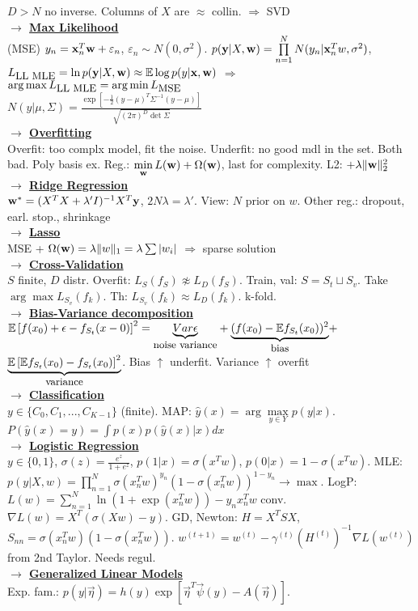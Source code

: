 \documentclass[12pt]{article}
\newcommand{\myvector}[1]{{\bf{#1}}}
\newcommand{\x}{\myvector{x}}
\newcommand{\y}{\myvector{y}}
\newcommand{\w}{\myvector{w}}
\newcommand{\underlabel}[2]{\underset{\mbox{\small #2}}{\underbrace{#1}}}
\newcommand{\mytitle}[1]{ {\bf $\rightarrow$ \underline{#1}}\\}
\begin{document}
\begin{multicols*}{2}
$D>N$ no inverse. Columns of $X$ are $\approx$ collin. $\Rightarrow$ SVD\\
\mytitle{Max Likelihood}
(MSE) $y_n=\x_n^T\w+\varepsilon_n$, $\varepsilon_n\sim N(0, \sigma^2)$. $p(\y|X,\w)=\prod\limits_{n=1}^NN(y_n|\x_n^Tw,\sigma^2)$, $L_{\mbox{\small LL MLE}}=\ln p(\y|X,\w)\approx \mathbb{E}\log p(y|\x,\w)$ $\Rightarrow$ $\arg\max L_{\mbox{\small LL MLE}}=\arg\min L_{\mbox{\small MSE}}$\\
$N(y|\mu,\Sigma)=\frac{\exp\left[-\frac{1}{2}(y-\mu)^T\Sigma^{-1}(y-\mu)\right]}{\sqrt{(2\pi)^D\det\Sigma}}$\\
\mytitle{Overfitting}
Overfit: too complx model, fit the noise.
Underfit: no good mdl in the set.
Both bad. Poly basis ex.
Reg.: $\min\limits_\w L(\w)+\Omega(\w)$, last for complexity.
L2: $+\lambda \|\w\|_2^2$\\
\mytitle{Ridge Regression}
$\w^*=(X^TX+\lambda'I)^{-1}X^T\y$, $2N\lambda=\lambda'$.
View: $N$ prior on $w$.
Other reg.: dropout, earl. stop., shrinkage\\
\mytitle{Lasso}
MSE + $\Omega(\w)=\lambda \|w\|_1=\lambda\sum |w_i|$ $\Rightarrow$ sparse solution\\
\mytitle{Cross-Validation}
$S$ finite, $D$ distr.
Overfit: $L_S(f_S)\not\approx L_D(f_S)$.
Train, val: $S=S_t\sqcup S_v$.
Take $\arg\max L_{S_v}(f_k)$.
Th: $L_{S_v}(f_k)\approx L_D(f_k)$.
k-fold.\\
\mytitle{Bias-Variance decomposition}
$\mathbb{E}\left[f(x_0)+\epsilon-f_{S_t}(x-0)\right]^2=\underlabel{Var\epsilon}{noise variance}+\underlabel{(f(x_0)-\mathbb{E}f_{S_t}(x_0))^2}{bias}+$
$\underlabel{\mathbb{E}\left[\mathbb{E}f_{S_t}(x_0)-f_{S_t}(x_0)\right]^2}{variance}$.
Bias $\uparrow$ underfit.
Variance $\uparrow$ overfit\\
\mytitle{Classification}
$y\in \{C_0,C_1,...,C_{K-1}\}$ (finite).
MAP: $\hat{y}(x)=\arg\max\limits_{y\in Y}p(y|x)$.
$P(\hat{y}(x)=y)=\int p(x)p(\hat{y}(x)|x)dx$\\
\mytitle{Logistic Regression}
$y\in\{0,1\}$, $\sigma(z)=\frac{e^z}{1+e^z}$, $p(1|x)=\sigma(x^Tw)$, $p(0|x)=1-\sigma(x^Tw)$.
MLE: $p(y|X,w)=\prod\limits_{n=1}^N\sigma(x_n^Tw)^{y_n}\left(1-\sigma(x_n^Tw)\right)^{1-y_n}\to\max$.
LogP: $L(w)=\sum\limits_{n=1}^N\ln(1+\exp(x_n^Tw))-y_nx_n^Tw$ conv.
$\nabla L(w)=X^T(\sigma(Xw)-y)$.
GD, Newton: $H=X^TSX$, $S_{nn}=\sigma(x_n^Tw)(1-\sigma(x_n^Tw))$.
$w^{(t+1)}=w^{(t)}-\gamma^{(t)}(H^{(t)})^{-1}\nabla L(w^{(t)})$ from 2nd Taylor.
Needs regul.\\
\mytitle{Generalized Linear Models}
Exp. fam.: $p(y|\vec{\eta})=h(y)\exp\left[\vec{\eta}^T\vec{\psi}(y)-A(\vec{\eta})\right]$.

\end{multicols*}
\end{document}
